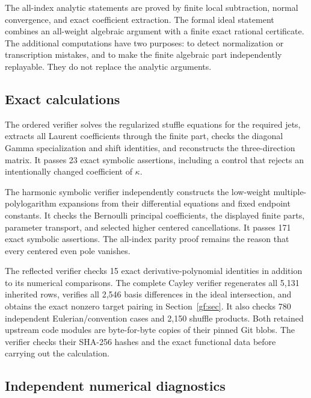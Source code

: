 \documentclass[11pt,a4paper]{article}
\numberwithin{equation}{section}
\theoremstyle{definition}
\theoremstyle{remark}
\begin{document}
The all-index analytic statements are proved by finite local
subtraction, normal convergence, and exact coefficient extraction.
The formal ideal statement combines an all-weight algebraic argument
with a finite exact rational certificate. The additional computations
have two purposes: to detect normalization or transcription mistakes,
and to make the finite algebraic part independently replayable.
They do not replace the analytic arguments.

\subsection{Exact calculations}

The ordered verifier solves the regularized stuffle equations for the
required jets, extracts all Laurent coefficients through the finite
part, checks the diagonal Gamma specialization and shift identities,
and reconstructs the three-direction matrix. It passes 23 exact
symbolic assertions, including a control that rejects an intentionally
changed coefficient of $\kappa$.

The harmonic symbolic verifier independently constructs the low-weight
multiple-polylogarithm expansions from their differential equations
and fixed endpoint constants. It checks the Bernoulli principal
coefficients, the displayed finite parts, parameter transport, and
selected higher centered cancellations. It passes 171 exact symbolic
assertions. The all-index parity proof remains the reason that every
centered even pole vanishes.

The reflected verifier checks 15 exact derivative-polynomial identities
in addition to its numerical comparisons. The complete Cayley verifier
regenerates all 5,131 inherited rows, verifies all 2,546 basis
differences in the ideal intersection, and obtains the exact nonzero
target pairing in Section~\ref{gf:sec}. It also checks 780 independent
Eulerian/convention cases and 2,150 shuffle products. Both retained
upstream code modules are byte-for-byte copies of their pinned Git
blobs. The verifier checks their SHA-256 hashes and the exact
functional data before carrying out the calculation.

\subsection{Independent numerical diagnostics}
\end{document}
